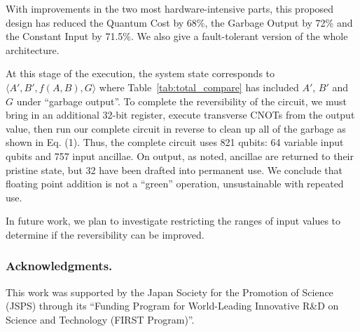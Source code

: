 \documentclass[%
reprint,
 amsmath,amssymb,
 aps,
]{revtex4-1}
\begin{document}
With improvements in the two most hardware-intensive parts, this proposed design has reduced the Quantum Cost by 68\%, the Garbage Output by 72\% and the Constant Input by 71.5\%. We also give a fault-tolerant version of the whole architecture.

\par At this stage of the execution, the system state corresponds to $\langle A',B',f(A,B),G \rangle $ where Table~\ref{tab:total_compare} has included $A'$, $B'$ and $G$ under ``garbage output''. To complete the reversibility of the circuit, we must bring in an additional 32-bit register, execute transverse CNOTs from the output value, then run our complete circuit in reverse to clean up all of the garbage as shown in Eq. (1). Thus, the complete circuit uses 821 qubits: 64 variable input qubits and 757 input ancillae. On output, as noted, ancillae are returned to their pristine state, but 32 have been drafted into permanent use. We conclude that floating point addition is not a ``green'' operation, unsustainable with repeated use. 

\par In future work, we plan to investigate restricting the ranges of input values to determine if the reversibility can be improved.
\subsubsection*{Acknowledgments.}

This work was supported by the Japan Society for the Promotion of Science (JSPS) through its ``Funding Program for World-Leading Innovative R\&D on Science and Technology (FIRST Program)''.

\end{document}
